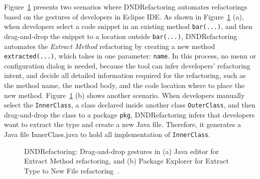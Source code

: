 \documentclass[runningheads,a4paper]{llncs}
\newcommand{\codefont}[1]{\footnotesize{\texttt{#1}}\normalsize}
\begin{document}
Figure~\ref{fig:dnd} presents two scenarios where DNDRefactoring automates refactorings based on the gestures of developers in Eclipse IDE. As shown in Figure~\ref{fig:dnd} (a), when developers select a code snippet in an existing method \codefont{bar(...)}, and then drag-and-drop the snippet to a location outside \codefont{bar(...)}, DNDRefactoring automates the \emph{Extract Method} refactoring by creating a new method \codefont{extracted(...)}, which takes in one parameter: \codefont{name}. In this process, no menu or configuration dialog is needed, because the tool can infer developers' refactoring intent, and decide all detailed information required for the refactoring, such as the method name, the method body, and the code location where to place the new method. Figure~\ref{fig:dnd} (b) shows another scenario. When developers manually select the \codefont{InnerClass}, a class declared inside another class \codefont{OuterClass}, and then drag-and-drop the class to a package \codefont{pkg}, DNDRefactoring infers that developers want to extract the type and create a new Java file. Therefore, it generates a Java file InnerClass.java to hold all implementation of \codefont{InnerClass}.

\begin{figure}
\centering
{}
\caption{DNDRefactoring: Drag-and-drop gestures in (a) Java editor for Extract Method refactoring, and (b) Package Explorer for Extract Type to New File refactoring~\cite{Lee:2013}.}
\label{fig:dnd}
\end{figure}
\end{document}
